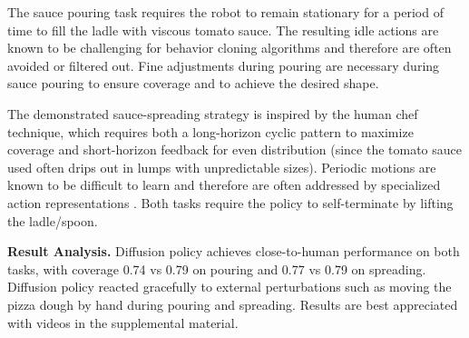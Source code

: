 \documentclass[Afour,sageh,times]{sagej}
\begin{document}
The sauce pouring task requires the robot to remain stationary for a period of time to fill the ladle with viscous tomato sauce. The resulting idle actions are known to be challenging for behavior cloning algorithms and therefore are often avoided or filtered out. Fine adjustments during pouring are necessary during sauce pouring to ensure coverage and to achieve the desired shape.

The demonstrated sauce-spreading strategy is inspired by the human chef technique, which requires both a long-horizon cyclic pattern to maximize coverage and short-horizon feedback for even distribution (since the tomato sauce used often drips out in lumps with unpredictable sizes). Periodic motions are known to be difficult to learn and therefore are often addressed by specialized action representations \cite{yang2022periodic}.
Both tasks require the policy to self-terminate by lifting the ladle/spoon.




\textbf{Result Analysis.}
Diffusion policy achieves close-to-human performance on both tasks, with coverage 0.74 vs 0.79 on pouring and 0.77 vs 0.79 on spreading. 
Diffusion policy reacted gracefully to external perturbations such as moving the pizza dough by hand during pouring and spreading. 
Results are best appreciated with videos in the supplemental material. 
\end{document}
